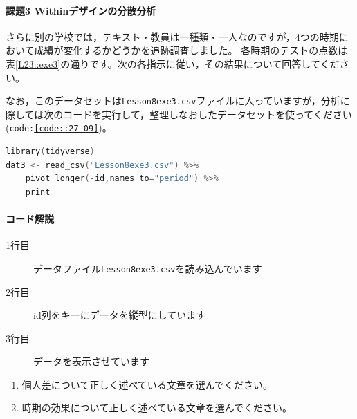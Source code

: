 \documentclass{ltjbook}
\begin{document}
\paragraph{課題3 Withinデザインの分散分析}
さらに別の学校では，テキスト・教員は一種類・一人なのですが，4つの時期において成績が変化するかどうかを追跡調査しました。
各時期のテストの点数は表\ref{L23::exe3}の通りです。次の各指示に従い，その結果について回答してください。

なお，このデータセットは\texttt{Lesson8exe3.csv}ファイルに入っていますが，分析に際しては次のコードを実行して，整理しなおしたデータセットを使ってください(\texttt{code:\ref{code::27_09}})。
\begin{lstlisting}[language=c++,label={code::27_09},caption={データを外部ファイルから読み込んで実行する}]
library(tidyverse)
dat3 <- read_csv("Lesson8exe3.csv") %>% 
    pivot_longer(-id,names_to="period") %>% 
    print
\end{lstlisting}
\paragraph{コード解説}
\begin{description}
    \item[1行目] データファイル\texttt{Lesson8exe3.csv}を読み込んでいます
    \item[2行目] id列をキーにデータを縦型にしています
    \item[3行目] データを表示させています
\end{description}
\begin{enumerate}
    \item 個人差について正しく述べている文章を選んでください。
    \item 時期の効果について正しく述べている文章を選んでください。
\end{enumerate}
\end{document}
